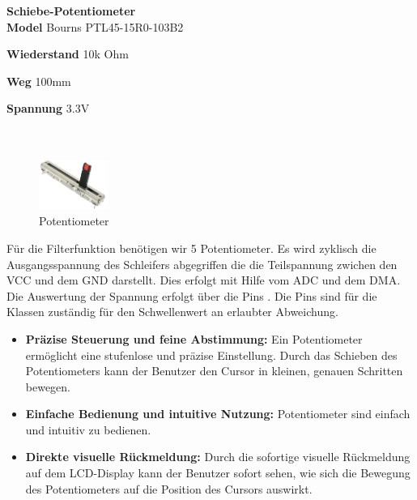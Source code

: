 \textbf{\hypertarget{Potentiometer}{Schiebe-Potentiometer}}\\

\textbf{Model} Bourns PTL45-15R0-103B2

\textbf{Wiederstand} 10k Ohm

\textbf{Weg} 100mm

\textbf{Spannung} 3.3V \\ \\ \\

	\begin{figure} %
	\vspace{-155pt + 0.02\textwidth}
	\hspace{0.07\textwidth} %
	\includegraphics[width=0.2\textwidth]{images/05_technische_spezifikation/Interface/Potentiometer.png} %
	\caption{Potentiometer}
	\label{fig:schiebe_potentiometer}
	\vspace{-20pt}
\end{figure}

Für die Filterfunktion benötigen wir 5 Potentiometer. Es wird zyklisch die Ausgangsspannung des Schleifers abgegriffen die die Teilspannung zwichen den VCC und dem GND darstellt. Dies erfolgt mit Hilfe vom ADC und dem DMA. Die Auswertung der Spannung erfolgt über die Pins  . Die Pins   sind für die Klassen zuständig   für den Schwellenwert an erlaubter Abweichung.

\begin{itemize}
	\item \textbf{Präzise Steuerung und feine Abstimmung:} Ein Potentiometer ermöglicht eine stufenlose und präzise Einstellung. Durch das Schieben des Potentiometers kann der Benutzer den Cursor in kleinen, genauen Schritten bewegen.
	\item \textbf{Einfache Bedienung und intuitive Nutzung:} Potentiometer sind einfach und intuitiv zu bedienen.
	\item \textbf{Direkte visuelle Rückmeldung:} Durch die sofortige visuelle Rückmeldung auf dem LCD-Display kann der Benutzer sofort sehen, wie sich die Bewegung des Potentiometers auf die Position des Cursors auswirkt.
\end{itemize}


